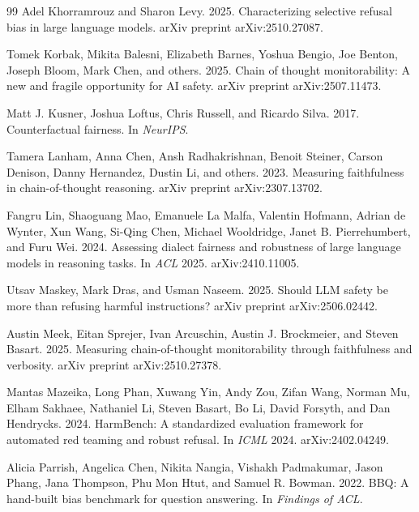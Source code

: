 \documentclass[10pt,a4paper,twocolumn]{article}
\begin{document}
\begin{thebibliography}{99}
Adel Khorramrouz and Sharon Levy. 2025. Characterizing selective refusal bias in large language models. arXiv preprint arXiv:2510.27087.

Tomek Korbak, Mikita Balesni, Elizabeth Barnes, Yoshua Bengio, Joe Benton, Joseph Bloom, Mark Chen, and others. 2025. Chain of thought monitorability: A new and fragile opportunity for AI safety. arXiv preprint arXiv:2507.11473.

Matt J. Kusner, Joshua Loftus, Chris Russell, and Ricardo Silva. 2017. Counterfactual fairness. In \emph{NeurIPS}.

Tamera Lanham, Anna Chen, Ansh Radhakrishnan, Benoit Steiner, Carson Denison, Danny Hernandez, Dustin Li, and others. 2023. Measuring faithfulness in chain-of-thought reasoning. arXiv preprint arXiv:2307.13702.

Fangru Lin, Shaoguang Mao, Emanuele La Malfa, Valentin Hofmann, Adrian de Wynter, Xun Wang, Si-Qing Chen, Michael Wooldridge, Janet B. Pierrehumbert, and Furu Wei. 2024. Assessing dialect fairness and robustness of large language models in reasoning tasks. In \emph{ACL} 2025. arXiv:2410.11005.

Utsav Maskey, Mark Dras, and Usman Naseem. 2025. Should LLM safety be more than refusing harmful instructions? arXiv preprint arXiv:2506.02442.

Austin Meek, Eitan Sprejer, Ivan Arcuschin, Austin J. Brockmeier, and Steven Basart. 2025. Measuring chain-of-thought monitorability through faithfulness and verbosity. arXiv preprint arXiv:2510.27378.

Mantas Mazeika, Long Phan, Xuwang Yin, Andy Zou, Zifan Wang, Norman Mu, Elham Sakhaee, Nathaniel Li, Steven Basart, Bo Li, David Forsyth, and Dan Hendrycks. 2024. HarmBench: A standardized evaluation framework for automated red teaming and robust refusal. In \emph{ICML} 2024. arXiv:2402.04249.

Alicia Parrish, Angelica Chen, Nikita Nangia, Vishakh Padmakumar, Jason Phang, Jana Thompson, Phu Mon Htut, and Samuel R. Bowman. 2022. BBQ: A hand-built bias benchmark for question answering. In \emph{Findings of ACL}.


\end{thebibliography}
\end{document}
